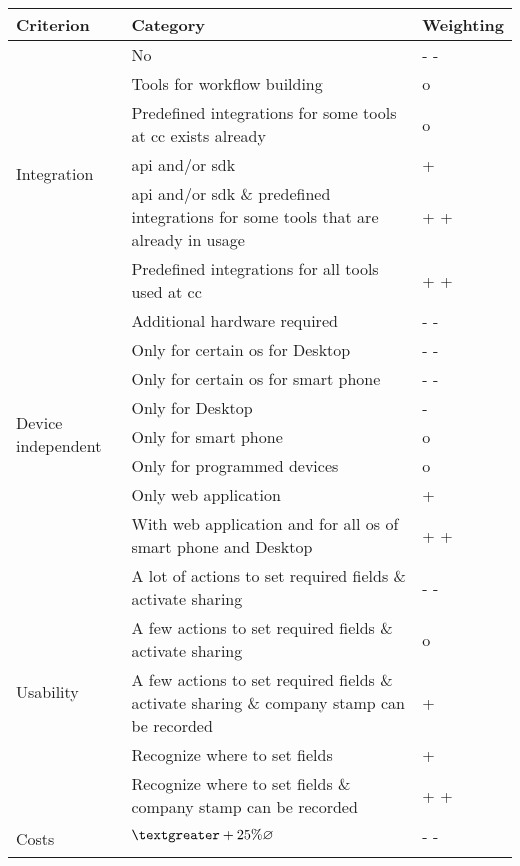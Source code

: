 	\begin{longtable}{|p{4cm}|p{9cm}|p{1.5cm}|} \hline
		\rowcolor{Gray}Criterion & Category & Weighting \\ \hline
		\multirow{6}{*}{Integration} & No & - - \\ \cline{2-3}
									& Tools for workflow building & o \\ \cline{2-3}
									& Predefined integrations for some tools at \gls{cc} exists already & o \\ \cline{2-3}
									& \Gls{api} and/or \gls{sdk} & + \\ \cline{2-3}
									& \Gls{api} and/or \gls{sdk} \& predefined integrations for some tools that are already in usage & + + \\ \cline{2-3}
									& Predefined integrations for all tools used at \gls{cc} & + + \\ \hline 
		\multirow{8}{*}{Device independent} & Additional hardware required & - - \\ \cline{2-3}
											& Only for certain \gls{os} for Desktop & - - \\ \cline{2-3}
											& Only for certain \gls{os} for smart phone & - - \\ \cline{2-3} 
											& Only for Desktop & - \\ \cline{2-3}
											& Only for smart phone & o \\ \cline{2-3}
											& Only for programmed devices & o \\ \cline{2-3}
											& Only web application & + \\ \cline{2-3}
											& With web application and for all \gls{os} of smart phone and Desktop & + + \\ \hline
		\multirow{5}{*}{Usability} & A lot of actions to set required fields \& activate sharing & - - \\ \cline{2-3}
								    & A few actions to set required fields \& activate sharing & o \\ \cline{2-3}
									& A few actions to set required fields \& activate sharing \& company stamp can be recorded & + \\ \cline{2-3}
									& Recognize where to set fields & + \\ \cline{2-3}
									& Recognize where to set fields \& company stamp can be recorded & + + \\ \hline
		\multirow{5}{*}{Costs}  & $ \textgreater +25\% \varnothing $ & - - \\ \cline{2-3}

\end{longtable}

